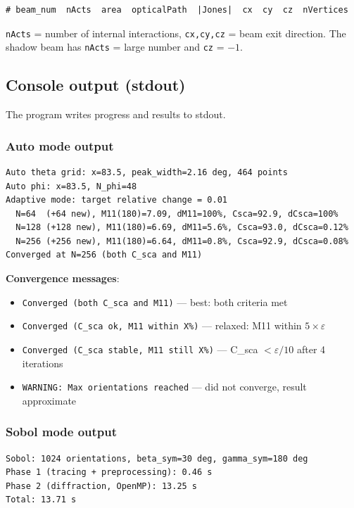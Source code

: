 \documentclass[11pt,a4paper]{article}
\begin{document}
\begin{lstlisting}[basicstyle=\ttfamily\scriptsize]
# beam_num  nActs  area  opticalPath  |Jones|  cx  cy  cz  nVertices
\end{lstlisting}

\texttt{nActs} = number of internal interactions, \texttt{cx,cy,cz} = beam exit direction.
The shadow beam has \texttt{nActs} = large number and \texttt{cz} = $-1$.

\subsection{Console output (stdout)}

The program writes progress and results to stdout.

\subsubsection{Auto mode output}
\begin{lstlisting}[basicstyle=\ttfamily\scriptsize]
Auto theta grid: x=83.5, peak_width=2.16 deg, 464 points
Auto phi: x=83.5, N_phi=48
Adaptive mode: target relative change = 0.01
  N=64  (+64 new), M11(180)=7.09, dM11=100%, Csca=92.9, dCsca=100%
  N=128 (+128 new), M11(180)=6.69, dM11=5.6%, Csca=93.0, dCsca=0.12%
  N=256 (+256 new), M11(180)=6.64, dM11=0.8%, Csca=92.9, dCsca=0.08%
Converged at N=256 (both C_sca and M11)
\end{lstlisting}

\textbf{Convergence messages}:
\begin{itemize}
\item \texttt{Converged (both C\_sca and M11)} --- best: both criteria met
\item \texttt{Converged (C\_sca ok, M11 within X\%)} --- relaxed: M11 within $5\times\varepsilon$
\item \texttt{Converged (C\_sca stable, M11 still X\%)} --- C\_sca $< \varepsilon/10$ after 4 iterations
\item \texttt{WARNING: Max orientations reached} --- did not converge, result approximate
\end{itemize}

\subsubsection{Sobol mode output}
\begin{lstlisting}[basicstyle=\ttfamily\scriptsize]
Sobol: 1024 orientations, beta_sym=30 deg, gamma_sym=180 deg
Phase 1 (tracing + preprocessing): 0.46 s
Phase 2 (diffraction, OpenMP): 13.25 s
Total: 13.71 s
\end{lstlisting}
\end{document}
